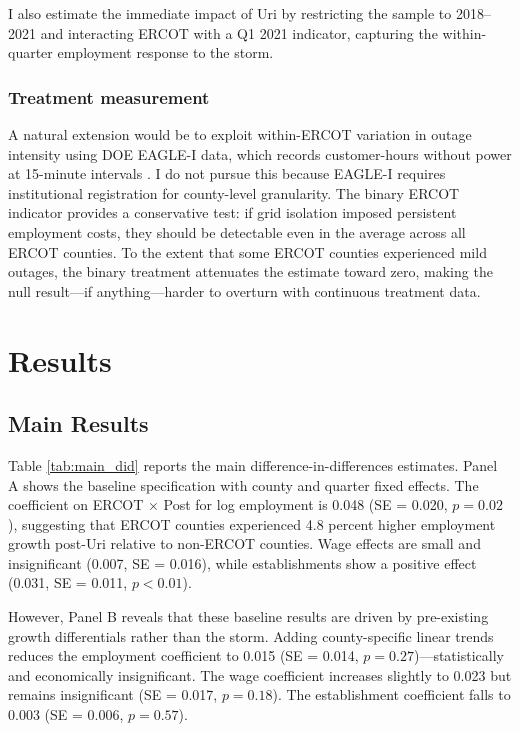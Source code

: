 \documentclass[12pt]{article}
\begin{document}
I also estimate the immediate impact of Uri by restricting the sample to 2018--2021 and interacting ERCOT with a Q1 2021 indicator, capturing the within-quarter employment response to the storm.

\subsubsection*{Treatment measurement} A natural extension would be to exploit within-ERCOT variation in outage intensity using DOE EAGLE-I data, which records customer-hours without power at 15-minute intervals \citep{busby2021cascading}. I do not pursue this because EAGLE-I requires institutional registration for county-level granularity. The binary ERCOT indicator provides a conservative test: if grid isolation imposed persistent employment costs, they should be detectable even in the average across all ERCOT counties. To the extent that some ERCOT counties experienced mild outages, the binary treatment attenuates the estimate toward zero, making the null result---if anything---harder to overturn with continuous treatment data.


\section{Results}

\subsection{Main Results}

Table \ref{tab:main_did} reports the main difference-in-differences estimates. Panel A shows the baseline specification with county and quarter fixed effects. The coefficient on ERCOT $\times$ Post for log employment is 0.048 (SE = 0.020, $p = 0.02$), suggesting that ERCOT counties experienced 4.8 percent higher employment growth post-Uri relative to non-ERCOT counties. Wage effects are small and insignificant (0.007, SE = 0.016), while establishments show a positive effect (0.031, SE = 0.011, $p < 0.01$).

However, Panel B reveals that these baseline results are driven by pre-existing growth differentials rather than the storm. Adding county-specific linear trends reduces the employment coefficient to 0.015 (SE = 0.014, $p = 0.27$)---statistically and economically insignificant. The wage coefficient increases slightly to 0.023 but remains insignificant (SE = 0.017, $p = 0.18$). The establishment coefficient falls to 0.003 (SE = 0.006, $p = 0.57$).
\end{document}
